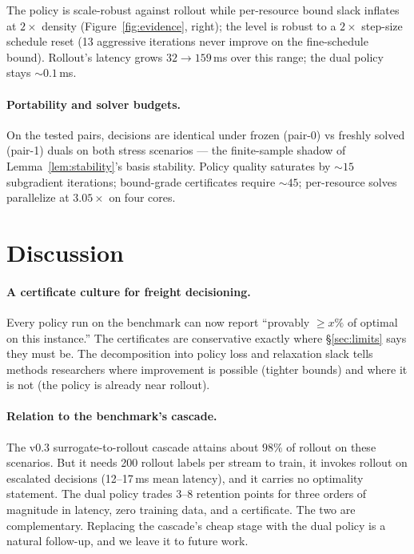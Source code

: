\documentclass[11pt]{article}
\begin{document}
The policy is scale-robust against rollout while per-resource bound
slack inflates at $2\times$ density (Figure~\ref{fig:evidence}, right); the level is robust to a $2\times$
step-size schedule reset (13 aggressive iterations never improve on the
fine-schedule bound). Rollout's latency grows $32 \to 159$\,ms over this
range; the dual policy stays ${\sim}0.1$\,ms.

\paragraph{Portability and solver budgets.} On the tested pairs,
decisions are identical under frozen (pair-0) vs freshly solved
(pair-1) duals on both stress scenarios
--- the finite-sample shadow of Lemma~\ref{lem:stability}'s basis
stability. Policy quality saturates by ${\sim}15$ subgradient
iterations; bound-grade certificates require ${\sim}45$; per-resource
solves parallelize at $3.05\times$ on four cores.

\section{Discussion}
\label{sec:discussion}

\paragraph{A certificate culture for freight decisioning.} Every policy
run on the benchmark can now report ``provably $\geq x\%$ of optimal on
this instance.'' The certificates are conservative exactly where
\S\ref{sec:limits} says they must be. The decomposition into policy
loss and relaxation slack tells methods researchers where improvement
is possible (tighter bounds) and where it is not (the policy is already
near rollout).

\paragraph{Relation to the benchmark's cascade.} The v0.3
surrogate-to-rollout cascade \citep{chandrasekaran2026freightbidbench}
attains about $98\%$ of rollout on these scenarios. But it needs 200
rollout labels per stream to train, it invokes rollout on escalated
decisions (12--17\,ms mean latency), and it carries no optimality
statement. The dual policy trades 3--8 retention points for three
orders of magnitude in latency, zero training data, and a certificate.
The two are complementary. Replacing the cascade's cheap stage with the
dual policy is a natural follow-up, and we leave it to future work.
\end{document}

